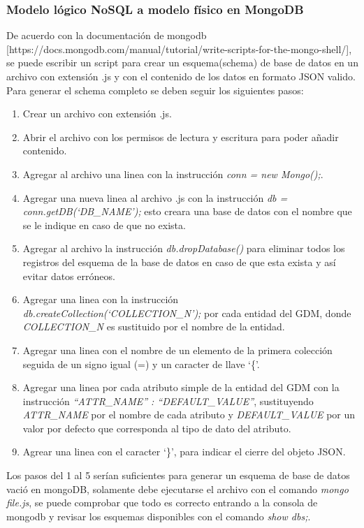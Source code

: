 \subsubsection{Modelo lógico NoSQL a modelo físico en MongoDB}


De acuerdo con la documentación de mongodb [https://docs.mongodb.com/manual/tutorial/write-scripts-for-the-mongo-shell/], se puede escribir un script para crear un esquema(schema)  de base de datos en un archivo con extensión .js y con el contenido de los datos en formato JSON valido. Para generar el schema completo se deben seguir los siguientes pasos:


\begin{enumerate}
    \item Crear un archivo con extensión .js.
    \item Abrir el archivo con los permisos de lectura y escritura para poder añadir contenido.
    \item Agregar al archivo una linea con la instrucción \textit{conn = new Mongo();}.
    \item Agregar una nueva linea al archivo .js con la instrucción \textit{db = conn.getDB(`DB\_NAME');} esto creara una base de datos con el nombre que se le indique en caso de que no exista.
    \item Agregar al archivo la instrucción \textit{db.dropDatabase()} para eliminar todos los registros del esquema de la base de datos en caso de que esta exista y así evitar datos erróneos.
    \item Agregar una linea con la instrucción \textit{db.createCollection(`COLLECTION\_N');} por cada entidad del GDM, donde \textit{COLLECTION\_N} es sustituido por el nombre de la entidad.
    \item Agregar una linea con el nombre de un elemento de la primera colección seguida de un signo igual (=) y un caracter de llave `\{'.
    \item Agregar una linea por cada atributo simple de la entidad del GDM con la instrucción \textit{``ATTR\_NAME'' : ``DEFAULT\_VALUE''}, sustituyendo \textit{ATTR\_NAME} por el nombre de cada atributo y \textit{DEFAULT\_VALUE} por un valor por defecto que corresponda al tipo de dato del atributo.
    \item Agrear una linea con el caracter `\}', para indicar el cierre del objeto JSON.
\end{enumerate}


Los pasos del 1 al 5 serían suficientes para generar un esquema de base de datos vació en mongoDB, solamente debe ejecutarse el archivo con el comando \textit{mongo file.js}, se puede comprobar que todo es correcto entrando a la consola de mongodb y revisar los esquemas disponibles con el comando \textit{show dbs;}.


